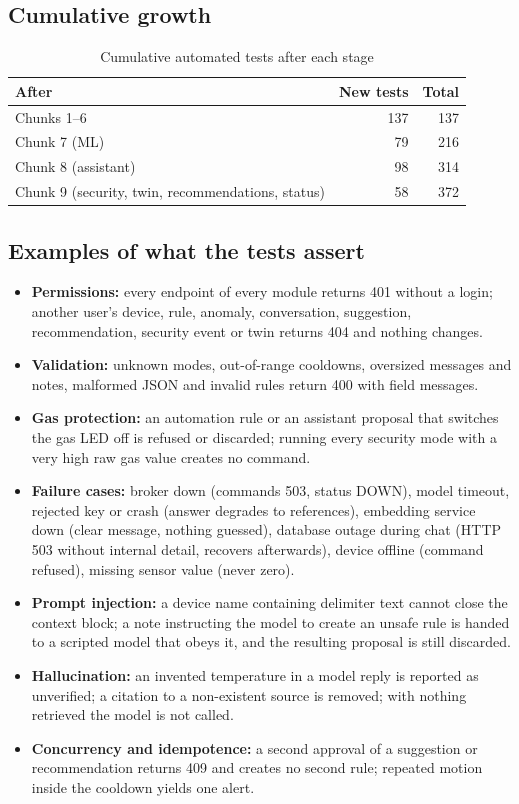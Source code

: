 \documentclass[12pt,a4paper,oneside]{report}
\newcommand{\code}[1]{\texttt{\detokenize{#1}}}
\begin{document}
\subsection{Cumulative growth}
\begin{table}[H]
\centering
\caption{Cumulative automated tests after each stage}
\label{tab:cumulative}
\begin{tabular}{lrr}
\toprule
\textbf{After} & \textbf{New tests} & \textbf{Total}\\
\midrule
Chunks 1--6 & 137 & 137\\
Chunk 7 (ML) & 79 & 216\\
Chunk 8 (assistant) & 98 & 314\\
Chunk 9 (security, twin, recommendations, status) & 58 & 372\\
\bottomrule
\end{tabular}
\end{table}

\subsection{Examples of what the tests assert}
\begin{itemize}
  \item \textbf{Permissions:} every endpoint of every module returns 401 without a login; another user's device, rule, anomaly, conversation, suggestion, recommendation, security event or twin returns 404 and nothing changes.
  \item \textbf{Validation:} unknown modes, out-of-range cooldowns, oversized messages and notes, malformed JSON and invalid rules return 400 with field messages.
  \item \textbf{Gas protection:} an automation rule or an assistant proposal that switches the gas LED off is refused or discarded; running every security mode with a very high raw gas value creates no \code{set_gas_led} command.
  \item \textbf{Failure cases:} broker down (commands 503, status DOWN), model timeout, rejected key or crash (answer degrades to references), embedding service down (clear message, nothing guessed), database outage during chat (HTTP 503 without internal detail, recovers afterwards), device offline (command refused), missing sensor value (never zero).
  \item \textbf{Prompt injection:} a device name containing delimiter text cannot close the context block; a note instructing the model to create an unsafe rule is handed to a scripted model that obeys it, and the resulting proposal is still discarded.
  \item \textbf{Hallucination:} an invented temperature in a model reply is reported as unverified; a citation to a non-existent source is removed; with nothing retrieved the model is not called.
  \item \textbf{Concurrency and idempotence:} a second approval of a suggestion or recommendation returns 409 and creates no second rule; repeated motion inside the cooldown yields one alert.
\end{itemize}
\end{document}
